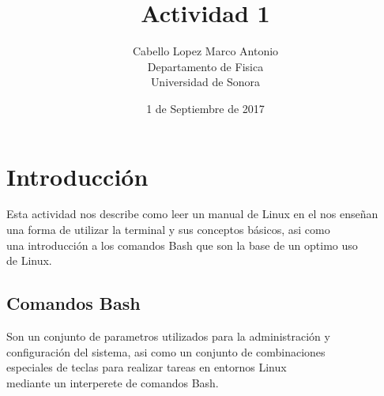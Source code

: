 \documentclass{article}
\title{Actividad 1}
\author{Cabello Lopez Marco Antonio\\
Departamento de Fisica \\
Universidad de Sonora}
\date{1 de Septiembre de 2017}
\begin{document}
\maketitle
\clearpage

\section{Introducción}
Esta actividad nos describe como leer un manual de Linux en el nos enseñan\\
una forma de utilizar la terminal y sus conceptos básicos, asi como  \\
una introducción a los comandos Bash que son la base de un optimo uso \\
de Linux.
\subsection{Comandos Bash}
Son un conjunto de parametros utilizados para la administración y\\
configuración del sistema, asi como un conjunto de combinaciones \\
especiales de teclas para realizar tareas en entornos Linux      \\
mediante un interperete de comandos Bash.
\end{document}
